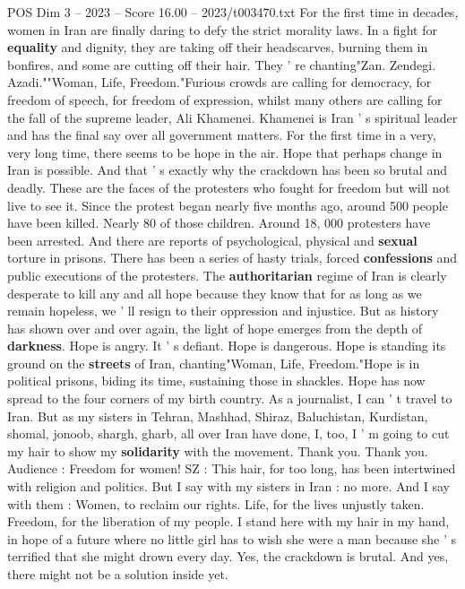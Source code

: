\begin{textsample}{POS Dim 3 – 2023 – Score 16.00 – 2023/t003470.txt}
For the first time in decades, women in Iran are finally daring to defy the strict morality laws.
In a fight for \textbf{equality} and dignity, they are taking off their headscarves, burning them in bonfires, and some are cutting off their hair.
They ' re chanting"Zan.
Zendegi.
Azadi.""Woman, Life, Freedom."Furious crowds are calling for democracy, for freedom of speech, for freedom of expression, whilst many others are calling for the fall of the supreme leader, Ali Khamenei.
Khamenei is Iran ' s spiritual leader and has the final say over all government matters.
For the first time in a very, very long time, there seems to be hope in the air.
Hope that perhaps change in Iran is possible.
And that ' s exactly why the crackdown has been so brutal and deadly.
These are the faces of the protesters who fought for freedom but will not live to see it.
Since the protest began nearly five months ago, around 500 people have been killed.
Nearly 80 of those children.
Around 18, 000 protesters have been arrested.
And there are reports of psychological, physical and \textbf{sexual} torture in prisons.
There has been a series of hasty trials, forced \textbf{confessions} and public executions of the protesters.
The \textbf{authoritarian} regime of Iran is clearly desperate to kill any and all hope because they know that for as long as we remain hopeless, we ' ll resign to their oppression and injustice.
But as history has shown over and over again, the light of hope emerges from the depth of \textbf{darkness}.
Hope is angry.
It ' s defiant.
Hope is dangerous.
Hope is standing its ground on the \textbf{streets} of Iran, chanting"Woman, Life, Freedom."Hope is in political prisons, biding its time, sustaining those in shackles.
Hope has now spread to the four corners of my birth country.
As a journalist, I can ' t travel to Iran.
But as my sisters in Tehran, Mashhad, Shiraz, Baluchistan, Kurdistan, shomal, jonoob, shargh, gharb, all over Iran have done, I, too, I ' m going to cut my hair to show my \textbf{solidarity} with the movement.
Thank you.
Thank you.
Audience : Freedom for women!
SZ : This hair, for too long, has been intertwined with religion and politics.
But I say with my sisters in Iran : no more.
And I say with them : Women, to reclaim our rights.
Life, for the lives unjustly taken.
Freedom, for the liberation of my people.
I stand here with my hair in my hand, in hope of a future where no little girl has to wish she were a man because she ' s terrified that she might drown every day.
Yes, the crackdown is brutal.
And yes, there might not be a solution inside yet.

\end{textsample}
